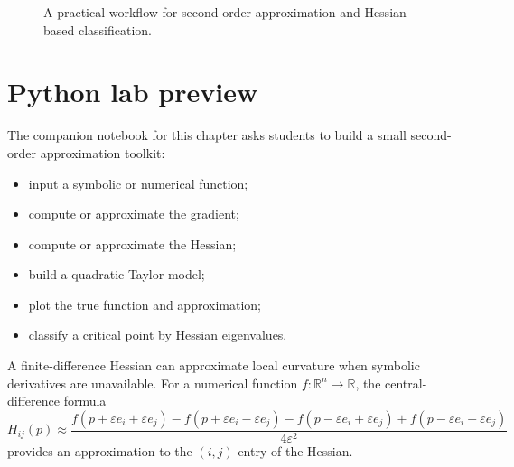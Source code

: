 \documentclass[11pt]{article}
\newcommand{\R}{\mathbb R}
\newcommand{\grad}{\nabla}
\begin{document}
\begin{figure}[H]
\centering
{}
\caption{A practical workflow for second-order approximation and Hessian-based classification.}
\end{figure}

\section{Python lab preview}

The companion notebook for this chapter asks students to build a small second-order approximation toolkit:
\begin{itemize}
  \item input a symbolic or numerical function;
  \item compute or approximate the gradient;
  \item compute or approximate the Hessian;
  \item build a quadratic Taylor model;
  \item plot the true function and approximation;
  \item classify a critical point by Hessian eigenvalues.
\end{itemize}

A finite-difference Hessian can approximate local curvature when symbolic derivatives are unavailable. For a numerical function $f:\R^n\to\R$, the central-difference formula
\[
H_{ij}(p)\approx
\frac{f(p+\varepsilon e_i+\varepsilon e_j)-f(p+\varepsilon e_i-\varepsilon e_j)-f(p-\varepsilon e_i+\varepsilon e_j)+f(p-\varepsilon e_i-\varepsilon e_j)}{4\varepsilon^2}
\]
provides an approximation to the $(i,j)$ entry of the Hessian.
\end{document}
